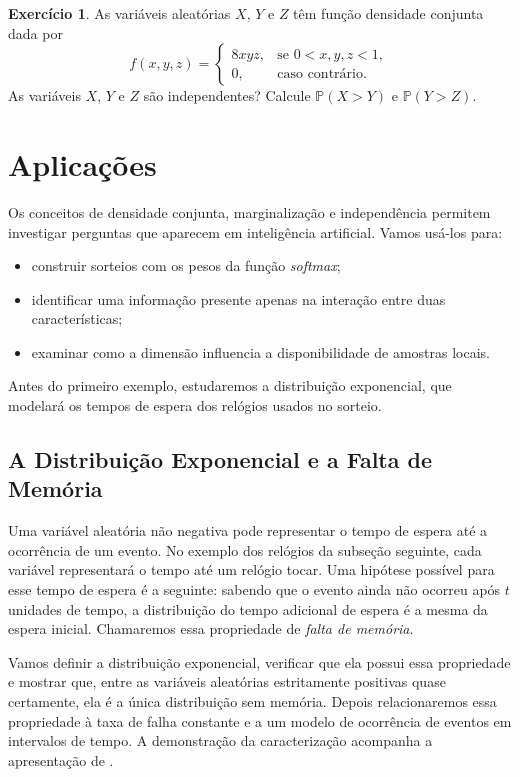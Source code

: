 \documentclass[12pt,portuguese]{article}
\theoremstyle{definition}
\theoremstyle{plainexercise}
\newtheorem{exercise}{Exercício}
\theoremstyle{starredexercise}
\theoremstyle{definition}
\begin{document}
\begin{exercise}\label{exercise:independencia-tres-variaveis}
  As variáveis aleatórias $X$, $Y$ e $Z$ têm função densidade conjunta dada por
  \[
    f(x, y, z) =
    \begin{cases}
      8xyz, & \text{se } 0 < x,y,z < 1, \\[0.2cm]
      0, & \text{caso contrário}.
    \end{cases}
  \]
  As variáveis $X$, $Y$ e $Z$ são independentes? Calcule $\mathbb{P}(X > Y)$
  e $\mathbb{P}(Y > Z)$.
\end{exercise}

\section{Aplicações}\label{sec:aplicacoes-vetores-continuos}
Os conceitos de densidade conjunta, marginalização e independência permitem
investigar perguntas que aparecem em inteligência artificial. Vamos usá-los
para:
\begin{itemize}
\item construir sorteios com os pesos da função \emph{softmax};
\item identificar uma informação presente apenas na interação entre duas características;
\item examinar como a dimensão influencia a disponibilidade de amostras locais.
\end{itemize}
Antes do primeiro exemplo, estudaremos a distribuição exponencial, que
modelará os tempos de espera dos relógios usados no sorteio.

\subsection{A Distribuição Exponencial e a Falta de Memória}\label{subsec:exponencial-falta-memoria}

Uma variável aleatória não negativa pode representar o tempo de espera até
a ocorrência de um evento. No exemplo dos relógios da subseção seguinte,
cada variável representará o tempo até um relógio tocar. Uma hipótese
possível para esse tempo de espera é a seguinte: sabendo que o evento ainda
não ocorreu após $t$ unidades de tempo, a distribuição do tempo adicional
de espera é a mesma da espera inicial. Chamaremos essa propriedade de
\emph{falta de memória}.

Vamos definir a distribuição exponencial, verificar que ela possui essa
propriedade e mostrar que, entre as variáveis aleatórias estritamente
positivas quase certamente, ela é a única distribuição sem memória.
Depois relacionaremos essa propriedade à taxa de falha constante e a um
modelo de ocorrência de eventos em intervalos de tempo. A demonstração da
caracterização acompanha a apresentação de \cite[Seção~5.5]{Ross2010}.
\end{document}
